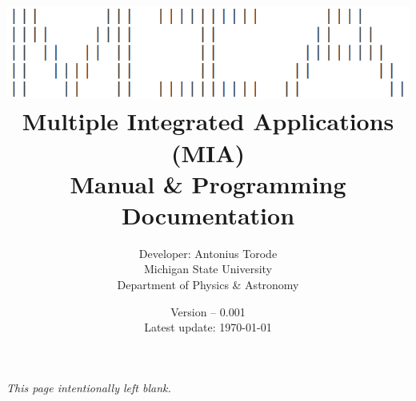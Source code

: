 \documentclass[openany,a4paper,11pt]{book}
\title{\vspace{0.1cm}  \includegraphics[scale=0.5]{./images/MIA_cropped_Inverted.png} \vspace{.5cm} \\ Multiple Integrated Applications (MIA) \\  Manual \& Programming Documentation}
\author{Developer: Antonius Torode \\ Michigan State University \\ Department of Physics \& Astronomy}
\date{Version -- 0.001 \\ Latest update: \today}
\begin{document}
\frontmatter
\maketitle

\tableofcontents
\newpage
\vspace*{\fill}
\begin{center}
	\textit{This page intentionally left blank.}
\end{center}
\vspace*{\fill}

\mainmatter
\pagestyle{fancy}
\fancyhf{}
\fancyhead[RO, LE]{\thepage}





\backmatter


\printindex
\end{document}
